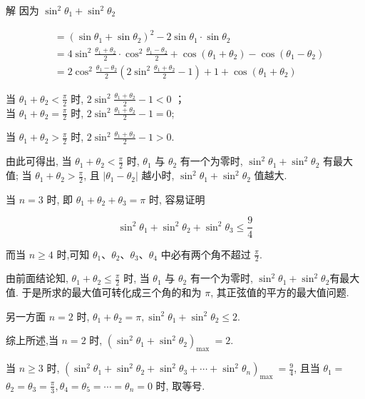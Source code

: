 	解 因为 $\sin ^{2} \theta_{1}+\sin ^{2} \theta_{2}$

	$$
		\begin{aligned}
			 & =\left(\sin \theta_{1}+\sin \theta_{2}\right)^{2}-2 \sin \theta_{1} \cdot \sin \theta_{2}                                                                                    \\
			 & =4 \sin ^{2} \frac{\theta_{1}+\theta_{2}}{2} \cdot \cos ^{2} \frac{\theta_{1}-\theta_{2}}{2}+\cos \left(\theta_{1}+\theta_{2}\right)-\cos \left(\theta_{1}-\theta_{2}\right) \\
			 & =2 \cos ^{2} \frac{\theta_{1}-\theta_{2}}{2}\left(2 \sin ^{2} \frac{\theta_{1}+\theta_{2}}{2}-1\right)+1+\cos \left(\theta_{1}+\theta_{2}\right)
		\end{aligned}
	$$

	当 $\theta_{1}+\theta_{2}<\frac{\pi}{2}$ 时, $2 \sin ^{2} \frac{\theta_{1}+\theta_{2}}{2}-1<0$ ；\\
	当 $\theta_{1}+\theta_{2}=\frac{\pi}{2}$ 时, $2 \sin ^{2} \frac{\theta_{1}+\theta_{2}}{2}-1=0$;

	当 $\theta_{1}+\theta_{2}>\frac{\pi}{2}$ 时, $2 \sin ^{2} \frac{\theta_{1}+\theta_{2}}{2}-1>0$.

	由此可得出, 当 $\theta_{1}+\theta_{2}<\frac{\pi}{2}$ 时, $\theta_{1}$ 与 $\theta_{2}$ 有一个为零时, $\sin ^{2} \theta_{1}+\sin ^{2} \theta_{2}$ 有最大值; 当 $\theta_{1}+\theta_{2}>\frac{\pi}{2}$, 且 $\left|\theta_{1}-\theta_{2}\right|$ 越小时, $\sin ^{2} \theta_{1}+\sin ^{2} \theta_{2}$ 值越大.

	当 $n=3$ 时, 即 $\theta_{1}+\theta_{2}+\theta_{3}=\pi$ 时, 容易证明

	$$
		\sin ^{2} \theta_{1}+\sin ^{2} \theta_{2}+\sin ^{2} \theta_{3} \leqslant \frac{9}{4}
	$$

	而当 $n \geqslant 4$ 时,可知 $\theta_{1} 、 \theta_{2} 、 \theta_{3} 、 \theta_{4}$ 中必有两个角不超过 $\frac{\pi}{2}$.

	由前面结论知, $\theta_{1}+\theta_{2} \leqslant \frac{\pi}{2}$ 时, 当 $\theta_{1}$ 与 $\theta_{2}$ 有一个为零时, $\sin ^{2} \theta_{1}+\sin ^{2} \theta_{2}$有最大值. 于是所求的最大值可转化成三个角的和为 $\pi$, 其正弦值的平方的最大值问题.

	另一方面 $n=2$ 时, $\theta_{1}+\theta_{2}=\pi, \sin ^{2} \theta_{1}+\sin ^{2} \theta_{2} \leqslant 2$.

	综上所述,当 $n=2$ 时, $\left(\sin ^{2} \theta_{1}+\sin ^{2} \theta_{2}\right)_{\text {max }}=2$.

	当 $n \geqslant 3$ 时, $\left(\sin ^{2} \theta_{1}+\sin ^{2} \theta_{2}+\sin ^{2} \theta_{3}+\cdots+\sin ^{2} \theta_{n}\right)_{\text {max }}=\frac{9}{4}$, 且当 $\theta_{1}=$ $\theta_{2}=\theta_{3}=\frac{\pi}{3}, \theta_{4}=\theta_{5}=\cdots=\theta_{n}=0$ 时, 取等号.

